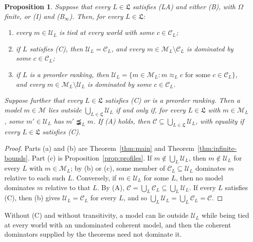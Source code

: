 \documentclass[11pt]{article}
\newtheorem{proposition}[theorem]{Proposition}
\theoremstyle{definition}
\theoremstyle{remark}
\newcommand{\M}{\mathcal M}
\newcommand{\C}{\mathcal C}
\newcommand{\U}{\mathcal U}
\begin{document}
\begin{proposition}\label{prop:permissible}
Suppose that every $L\in\mathfrak L$ satisfies (LA) and either (B), with $\Omega$ finite, or (I) and (B$_\infty$). Then, for every $L\in\mathfrak L$:
\begin{enumerate}[label=(\alph*)]
\item every $m\in\U_L$ is tied at every world with some $c\in\C_L$;
\item if $L$ satisfies (C), then $\U_L=\C_L$, and every $m\in\M_L\setminus\C_L$ is dominated by some $c\in\C_L$;
\item if $L$ is a preorder ranking, then $\U_L=\{m\in\M_L:m\approx_L c\text{ for some }c\in\C_L\}$, and every $m\in\M_L\setminus\U_L$ is dominated by some $c\in\C_L$.
\end{enumerate}
Suppose further that every $L\in\mathfrak L$ satisfies (C) or is a preorder ranking. Then a model $m\in\M$ lies outside $\bigcup_{L\in\mathfrak L}\U_L$ if and only if, for every $L\in\mathfrak L$ with $m\in\M_L$, some $m'\in\U_L$ has $m'\precneqq_L m$. If (A) holds, then $\C\subseteq\bigcup_{L\in\mathfrak L}\U_L$, with equality if every $L\in\mathfrak L$ satisfies (C).
\end{proposition}
\begin{proof}
Parts (a) and (b) are Theorem~\ref{thm:main} and Theorem~\ref{thm:infinite-bounds}. Part (c) is Proposition~\ref{prop:profiles}. If $m\notin\bigcup_L\U_L$, then $m\notin\U_L$ for every $L$ with $m\in\M_L$; by (b) or (c), some member of $\C_L\subseteq\U_L$ dominates $m$ relative to each such $L$. Conversely, if $m\in\U_L$ for some $L$, then no model dominates $m$ relative to that $L$. By (A), $\C=\bigcup_L\C_L\subseteq\bigcup_L\U_L$. If every $L$ satisfies (C), then (b) gives $\U_L=\C_L$ for every $L$, and so $\bigcup_L\U_L=\bigcup_L\C_L=\C$.
\end{proof}
Without (C) and without transitivity, a model can lie outside $\U_L$ while being tied at every world with an undominated coherent model, and then the coherent dominators supplied by the theorems need not dominate it.
\end{document}
